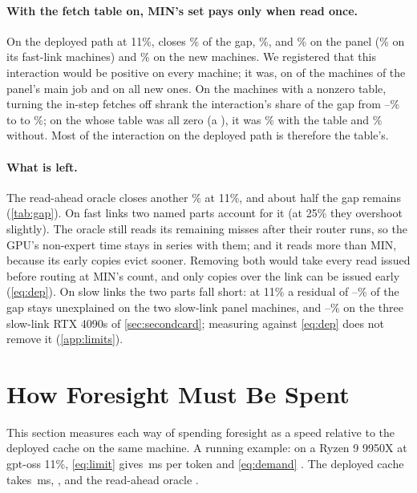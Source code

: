 \paragraph{With the fetch table on, MIN's set pays only when read once.} On the deployed path at 11\%, \MinTwo{}
closes \dmAllSetaloneLow\% of the gap, \DepOne{} \dmAllOncealoneLow\%, and \MinOne{} \dmAllTogetherLow\% on the panel
(\dmTogetherLow\% on its \dmFastN{} fast-link machines) and \dmNewTogetherLow\% on the new machines. We registered that
this interaction would be positive on every machine; it was, on \dmRegHeld{} of the \dmRegN{} machines of the panel's
main job and on all \dmNewInteractionPosLow{} new ones. On the machines with a nonzero table, turning the in-step
fetches off shrank the interaction's share of the gap from \dpShInteractionTabLowMin--\dpShInteractionTabLowMax\% to
\dpShInteractionZeroTabLowMin{} to \dpShInteractionZeroTabLowMax\%; on the \dpNoTabNWord{} whose table was all zero (a
\dpNoTabCpuUniq), it was \dpShInteractionNoTabLowRng\% with the table and \dpShInteractionZeroNoTabLowRng\% without. Most of the interaction on the
deployed path is therefore the table's.

\paragraph{What is left.} The read-ahead oracle closes another \dmAllAheadLow\% at 11\%, and about half the gap
remains (\cref{tab:gap}). On fast links two named parts account for it (at 25\% they overshoot slightly). The oracle still reads its remaining misses
after their router runs, so the GPU's non-expert time stays in series with them; and it reads more than MIN, because
its early copies evict sooner. Removing both would take every read issued before routing at MIN's count, and only
copies over the link can be issued early (\cref{eq:dep}). On slow links the two parts fall short: at 11\% a residual of
\dmSlowResidLowMin--\dmSlowResidLowMax\% of the gap stays unexplained on the two slow-link panel machines, and
\cxResidLowMin--\cxResidLowMax\% on the three slow-link RTX 4090s of \cref{sec:secondcard}; measuring against \cref{eq:dep} does not remove it
(\cref{app:limits}).

\section{How Foresight Must Be Spent}\label{sec:foresight}
This section measures each way of spending foresight as a speed relative to the deployed cache on the same machine. A
running example: on a Ryzen 9 9950X at gpt-oss 11\%, \cref{eq:limit} gives \slExBoundMs\,ms per token and
\cref{eq:demand} \slExDemandMs. The deployed cache takes \fsExBaseMs\,ms, \MinOne{} \fsExFetchMs, and the read-ahead
oracle \fsExPacedMs.

